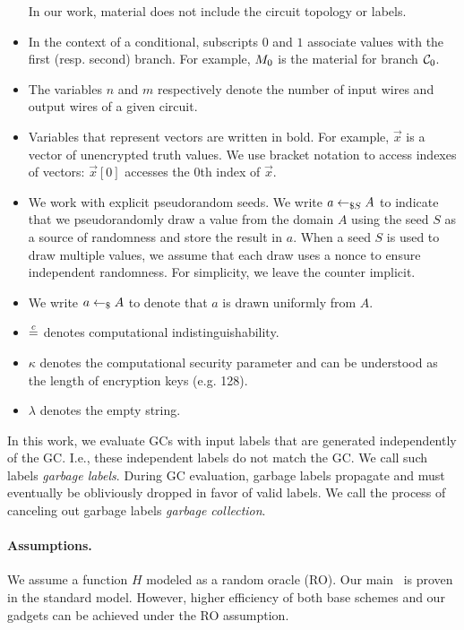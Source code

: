 \begin{itemize}
	In our work, material does not include the circuit topology or labels.
	\item In the context of a conditional, subscripts $0$ and $1$
	associate values with the first (resp.
	second) branch. For example, $M_0$ is the material
	for branch $\mathcal C_0$.
	\item The variables $n$ and $m$ respectively denote the number of input
	wires and output wires of a given circuit.
	\item Variables that represent vectors are written in bold. 
	For example, $\vec{x}$ is a vector of unencrypted truth values.
	We use bracket notation to access indexes of vectors: $\vec{x}[0]$ accesses the $0$th index of $\vec{x}$.
	\item We work with explicit pseudorandom seeds.
	We write $a \gets_{\$S} A$ to indicate that we pseudorandomly draw a value from the domain $A$ using the seed $S$ as a source of randomness and store the result in $a$.
	When a seed $S$ is used to draw multiple values, we assume that
	each draw uses a nonce to ensure independent randomness.
	For simplicity, we leave the counter implicit.
	\item We write $a \gets_{\$} A$ to denote that $a$ is drawn uniformly from $A$.
	\item $\overset{c}{=}$ denotes computational indistinguishability.
	\item $\kappa$ denotes the computational security parameter and can be understood as the length of encryption keys (e.g. 128).
	\item $\lambda$ denotes the empty string.
\end{itemize}

In this work, we evaluate GCs with input labels that are generated independently of the GC.
I.e., these independent labels do not match the GC.
We call such labels {\em garbage labels}.
During GC evaluation,  garbage labels propagate and must eventually  be obliviously dropped in favor of valid labels.
We call  the process of canceling out garbage labels {\em garbage collection}.

\paragraph{Assumptions.} We assume a function $H$ modeled as a random oracle (RO).  Our main~ \ourschemelong is proven in the standard model. However, higher efficiency of both base schemes and our gadgets can be achieved under the RO assumption.

